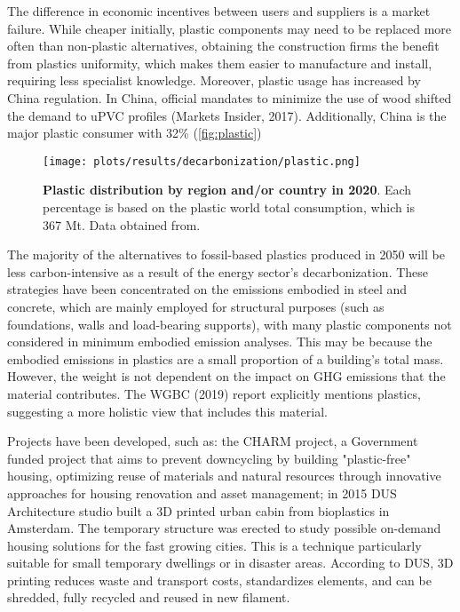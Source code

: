 The difference in economic incentives between users and suppliers is a market failure. While cheaper initially, plastic components may need to be replaced more often than non-plastic alternatives, obtaining the construction firms the benefit from plastics uniformity, which makes them easier to manufacture and install, requiring less specialist knowledge.\autocite{pickard2020phasing} Moreover, plastic usage has increased by China regulation. In China, official mandates to minimize the use of wood shifted the demand to uPVC profiles (Markets Insider, 2017). Additionally, China is the major plastic consumer with 32\% (\autoref{fig:plastic}) 

\begin{figure}[ht!]
  \centering
  \texttt{[image: plots/results/decarbonization/plastic.png]}
  \caption[Plastic distribution by region and/or country in 2020]{\textbf{Plastic distribution by region and/or country in 2020}. Each percentage is based on the plastic world total consumption, which is 367 Mt. Data obtained from.\autocite{plasticseurpo_2021}}
  \label{fig:plastic}
\end{figure}


The majority of the alternatives to fossil-based plastics produced in 2050 will be less carbon-intensive as a result of the energy sector's decarbonization.\autocite{pickard2020phasing} These strategies have been concentrated on the emissions embodied in steel and concrete, which are mainly employed for structural purposes (such as foundations, walls and load-bearing supports), with many plastic components not considered in minimum embodied emission analyses.\autocite{elkerbout2021impact} This may be because the embodied emissions in plastics are a small proportion of a building’s total mass. However, the weight is not dependent on the impact on GHG emissions that the material contributes. The WGBC (2019) report\autocite{world2019worldgbc} explicitly mentions plastics, suggesting a more holistic view that includes this material. 

Projects have been developed, such as: the CHARM project, a Government funded project that aims to prevent downcycling by building "plastic-free" housing, optimizing reuse of materials and natural resources through innovative approaches for housing renovation and asset management;\autocite{asbp_2020} in 2015 DUS Architecture studio built a 3D printed urban cabin from bioplastics in Amsterdam. The temporary structure was erected to study possible on-demand housing solutions for the fast growing cities. This is a technique particularly suitable for small temporary dwellings or in disaster areas. According to DUS, 3D printing reduces waste and transport costs, standardizes elements, and can be shredded, fully recycled and reused in new filament.\autocite{lanko2017additive} 

